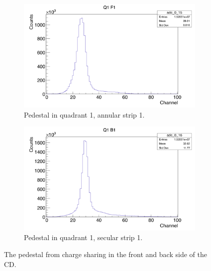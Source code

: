 \documentclass[twoside,english]{uiofysmaster/uiofysmaster}
\begin{document}
\begin{figure}
	\centering
	\begin{subfigure}{\textwidth}
		\centering
		\includegraphics[width=\textwidth]{../Plots/plotting/Pedestal_Q1_f1.png}
		\caption{Pedestal in quadrant 1, annular strip 1.}
		\label{fig:Pedestal_f}
	\end{subfigure}
	\begin{subfigure}{\textwidth}
		\centering
		\includegraphics[width=\textwidth]{../Plots/plotting/Pedestal_Q1_b1.png}
		\caption{Pedestal in quadrant 1, secular strip 1.}
		\label{fig:Pedestal_b}
	\end{subfigure}
	\caption{The pedestal from charge sharing in the front and back side of the CD.}
	\label{fig:Pedestal}
\end{figure}


%
%
%
\end{document}
